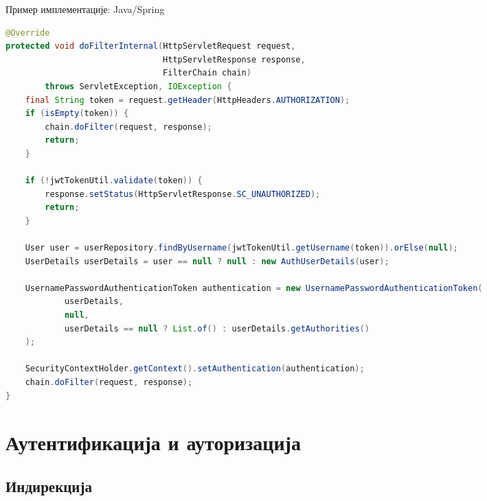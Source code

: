 \documentclass{beamer}
\begin{document}
    \begin{frame}[fragile]{Пример имплементације: Java/Spring}
        \begin{adjustbox}{width=\textwidth,height=0.7\textheight,keepaspectratio}
            \begin{lstlisting}[language=java]
@Override
protected void doFilterInternal(HttpServletRequest request,
                                HttpServletResponse response,
                                FilterChain chain)
        throws ServletException, IOException {
    final String token = request.getHeader(HttpHeaders.AUTHORIZATION);
    if (isEmpty(token)) {
        chain.doFilter(request, response);
        return;
    }

    if (!jwtTokenUtil.validate(token)) {
        response.setStatus(HttpServletResponse.SC_UNAUTHORIZED);
        return;
    }

    User user = userRepository.findByUsername(jwtTokenUtil.getUsername(token)).orElse(null);
    UserDetails userDetails = user == null ? null : new AuthUserDetails(user);

    UsernamePasswordAuthenticationToken authentication = new UsernamePasswordAuthenticationToken(
            userDetails,
            null,
            userDetails == null ? List.of() : userDetails.getAuthorities()
    );

    SecurityContextHolder.getContext().setAuthentication(authentication);
    chain.doFilter(request, response);
}
            \end{lstlisting}
        \end{adjustbox}
    \end{frame}
    
    \section{Аутентификација и ауторизација}
    \subsection{Индирекција}
    
\end{document}
